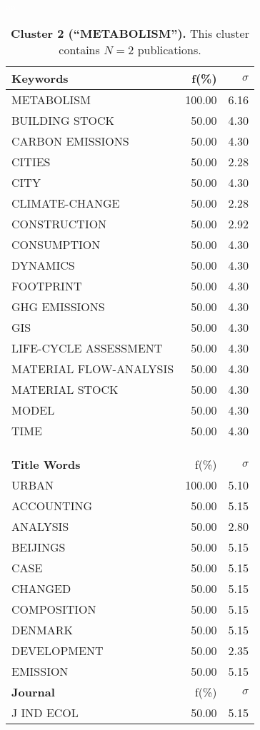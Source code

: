 \documentclass[a4paper,11pt]{report}
\begin{document}
\begin{landscape}
\begin{table}[!ht]
\caption*{{\bf Cluster 2 (``METABOLISM'').} This cluster contains $N = 2$ publications.} 
\textcolor{white}{aa}\\
{\scriptsize\begin{tabular}{|p{5cm} r r|}
\hline
{\bf Keywords }& f(\%) & $\sigma$\\
\hline
METABOLISM & 100.00 & 6.16\\
BUILDING STOCK & 50.00 & 4.30\\
CARBON EMISSIONS & 50.00 & 4.30\\
CITIES & 50.00 & 2.28\\
CITY & 50.00 & 4.30\\
CLIMATE-CHANGE & 50.00 & 2.28\\
CONSTRUCTION & 50.00 & 2.92\\
CONSUMPTION & 50.00 & 4.30\\
DYNAMICS & 50.00 & 4.30\\
FOOTPRINT & 50.00 & 4.30\\
GHG EMISSIONS & 50.00 & 4.30\\
GIS & 50.00 & 4.30\\
LIFE-CYCLE ASSESSMENT & 50.00 & 4.30\\
MATERIAL FLOW-ANALYSIS & 50.00 & 4.30\\
MATERIAL STOCK & 50.00 & 4.30\\
MODEL & 50.00 & 4.30\\
TIME & 50.00 & 4.30\\
 &  & \\
 &  & \\
 &  & \\
\hline
{\bf Title Words }& f(\%) & $\sigma$\\
\hline
URBAN & 100.00 & 5.10\\
ACCOUNTING & 50.00 & 5.15\\
ANALYSIS & 50.00 & 2.80\\
BEIJINGS & 50.00 & 5.15\\
CASE & 50.00 & 5.15\\
CHANGED & 50.00 & 5.15\\
COMPOSITION & 50.00 & 5.15\\
DENMARK & 50.00 & 5.15\\
DEVELOPMENT & 50.00 & 2.35\\
EMISSION & 50.00 & 5.15\\
\hline
{\bf Journal }& f(\%) & $\sigma$\\
\hline
J IND ECOL & 50.00 & 5.15\\

\end{tabular}}
\end{table}
\end{landscape}
\end{document}
